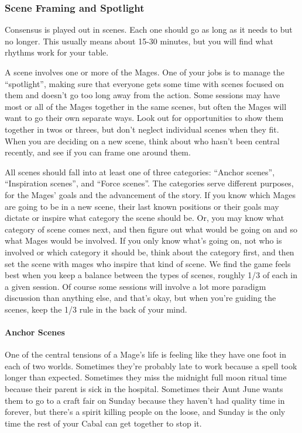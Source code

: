 \documentclass[
]{article}
\begin{document}
\hypertarget{scene-framing-and-spotlight}{%
\subsubsection{Scene Framing and
Spotlight}\label{scene-framing-and-spotlight}}

Consensus is played out in scenes. Each one should go as long as it
needs to but no longer. This usually means about 15-30 minutes, but you
will find what rhythms work for your table.

A scene involves one or more of the Mages. One of your jobs is to manage
the ``spotlight'', making sure that everyone gets some time with scenes
focused on them and doesn't go too long away from the action. Some
sessions may have most or all of the Mages together in the same scenes,
but often the Mages will want to go their own separate ways. Look out
for opportunities to show them together in twos or threes, but don't
neglect individual scenes when they fit. When you are deciding on a new
scene, think about who hasn't been central recently, and see if you can
frame one around them.

All scenes should fall into at least one of three categories: ``Anchor
scenes'', ``Inspiration scenes'', and ``Force scenes''. The categories
serve different purposes, for the Mages' goals and the advancement of
the story. If you know which Mages are going to be in a new scene, their
last known positions or their goals may dictate or inspire what category
the scene should be. Or, you may know what category of scene comes next,
and then figure out what would be going on and so what Mages would be
involved. If you only know what's going on, not who is involved or which
category it should be, think about the category first, and then set the
scene with mages who inspire that kind of scene. We find the game feels
best when you keep a balance between the types of scenes, roughly 1/3 of
each in a given session. Of course some sessions will involve a lot more
paradigm discussion than anything else, and that's okay, but when you're
guiding the scenes, keep the 1/3 rule in the back of your mind.

\hypertarget{anchor-scenes}{%
\paragraph{Anchor Scenes}\label{anchor-scenes}}

One of the central tensions of a Mage's life is feeling like they have
one foot in each of two worlds. Sometimes they're probably late to work
because a spell took longer than expected. Sometimes they miss the
midnight full moon ritual time because their parent is sick in the
hospital. Sometimes their Aunt June wants them to go to a craft fair on
Sunday because they haven't had quality time in forever, but there's a
spirit killing people on the loose, and Sunday is the only time the rest
of your Cabal can get together to stop it.
\end{document}

